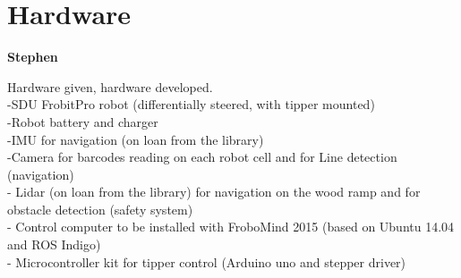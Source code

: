 \section{Hardware} %
\label{sec:mr_hardware}

\textbf{Stephen}

Hardware given, hardware developed.\\

-SDU FrobitPro robot (differentially steered, with tipper mounted)\\
-Robot battery and charger\\
-IMU for navigation (on loan from the library)\\
-Camera for barcodes reading on each robot cell and for Line detection (navigation)\\
- Lidar (on loan from the library) for navigation on the wood ramp and for obstacle detection (safety system)\\
- Control computer to be installed with FroboMind 2015 (based on Ubuntu 14.04 and ROS Indigo)\\
- Microcontroller kit for tipper control (Arduino uno and stepper driver)\\

